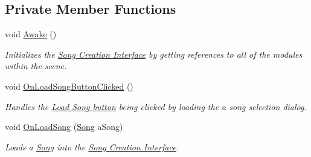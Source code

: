 \subsection*{Private Member Functions}
\begin{DoxyCompactItemize}
\item 
void \hyperlink{group___s_c_unity_ga0130f42289ace34cb59f70eedc858757}{Awake} ()
\begin{DoxyCompactList}\small\item\em Initializes the \hyperlink{group___doc_s_c}{Song Creation Interface} by getting references to all of the modules within the scene. \end{DoxyCompactList}\item 
void \hyperlink{group___s_c_handlers_ga77a56bedfce632cf7c341f8fefc02b9a}{On\+Load\+Song\+Button\+Clicked} ()
\begin{DoxyCompactList}\small\item\em Handles the \hyperlink{group___s_c_priv_var_ga0e016451dff405f570bf530586fb36fa}{Load Song button} being clicked by loading the a song selection dialog. \end{DoxyCompactList}\item 
void \hyperlink{group___s_c_handlers_ga309a4dafb5a81353c6a83bd12ef6a249}{On\+Load\+Song} (\hyperlink{class_song}{Song} a\+Song)
\begin{DoxyCompactList}\small\item\em Loads a \hyperlink{class_song}{Song} into the \hyperlink{group___doc_s_c}{Song Creation Interface}. \end{DoxyCompactList}\end{DoxyCompactItemize}
